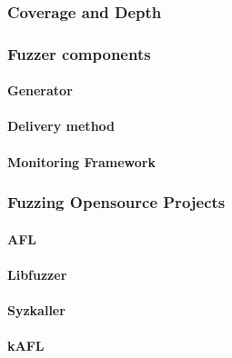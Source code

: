 \subsubsection{Coverage and Depth}

\subsubsection{Fuzzer components}

\paragraph{Generator}

\paragraph{Delivery method}

\paragraph{Monitoring Framework}

\subsubsection{Fuzzing Opensource Projects}

\paragraph{AFL}

\paragraph{Libfuzzer}

\paragraph{Syzkaller}

\paragraph{kAFL}
